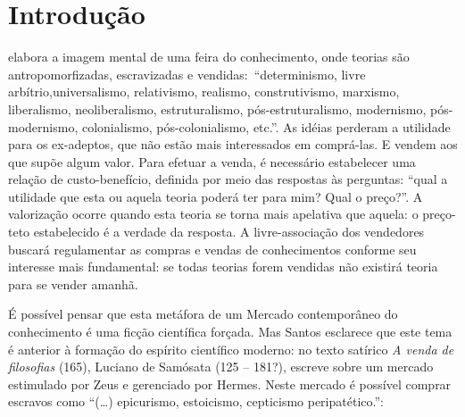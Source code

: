 \chapter*{Introdução} 


 elabora a imagem mental  de uma feira do conhecimento, onde teorias  são antropomorfizadas, escravizadas e vendidas:\ ``determinismo, livre arbítrio,universalismo, relativismo, realismo, construtivismo, marxismo, liberalismo, neoliberalismo, estruturalismo, pós-estruturalismo, modernismo, pós-modernismo, colonialismo, pós-colonialismo, etc.''. As idéias perderam a utilidade para os ex-adeptos, que não estão mais interessados em comprá-las. E vendem aos que supõe algum valor. Para efetuar a venda, é necessário estabelecer uma relação de custo-benefício, definida por meio das respostas às perguntas: ``qual a utilidade que esta ou aquela teoria poderá ter para mim? Qual o preço?''. A valorização ocorre quando esta teoria se torna mais apelativa que aquela: o preço-teto estabelecido é a verdade da resposta. A livre-associação dos vendedores buscará regulamentar as compras e vendas de conhecimentos conforme seu interesse mais fundamental: se todas teorias forem vendidas não existirá teoria para se vender amanhã.

É possível pensar que esta metáfora de um Mercado contemporâneo do conhecimento é uma ficção científica forçada. Mas Santos esclarece que este tema é anterior à formação do espírito científico moderno: no texto satírico \emph{A venda de filosofias} (165), Luciano de Samósata (125 -- 181?),  escreve sobre um mercado estimulado por Zeus e gerenciado por Hermes. Neste mercado é possível comprar escravos como  ``(\ldots) epicurismo, estoicismo, cepticismo peripatético.'':


